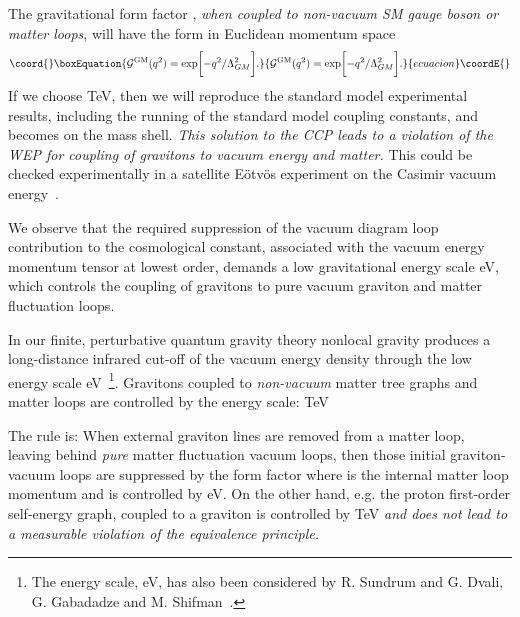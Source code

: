 \documentclass[a4paper,12pt]{article}
\begin{document}
The gravitational form factor \coordHE{}, {\it when
coupled to non-vacuum SM gauge boson or matter loops}, will have the form
in Euclidean momentum space
\begin{equation}\coord{}\boxEquation{ {\cal G}^{\rm GM}(q^2)
=\exp\biggl[-q^2/\Lambda_{GM}^2\biggr].
}{ {\cal G}^{\rm GM}(q^2)
=\exp\biggl[-q^2/\Lambda_{GM}^2\biggr].
}{ecuacion}\coordE{}\end{equation}
If we choose \coordHE{} TeV, then we will
reproduce the standard model experimental results, including the running
of the standard model coupling constants, and \coordHE{} becomes \coordHE{} on the mass
shell. {\it This solution to the CCP leads to a violation of the WEP for
coupling of gravitons to vacuum energy and matter.} This
could be checked experimentally in a satellite E\"otv\"os experiment on the
Casimir vacuum energy~\cite{Ross}.

We observe that the required suppression of the vacuum diagram
loop contribution to the cosmological constant, associated with
the vacuum energy momentum tensor at lowest order,
demands a low gravitational energy scale \coordHE{} eV, which controls the coupling of gravitons to
pure vacuum graviton and matter fluctuation loops.

In our finite, perturbative
quantum gravity theory nonlocal gravity produces a long-distance
infrared cut-off of the vacuum energy density through the low energy
scale \coordHE{} eV~\cite{Moffat2}\footnote{The energy scale,
\coordHE{} eV, has also
been considered by R. Sundrum and G. Dvali, G. Gabadadze and M.
Shifman~\cite{Sundrum}.}.
Gravitons coupled to {\it non-vacuum} matter tree graphs and matter loops
are controlled by the energy scale: \coordHE{}
TeV

The rule is: When external graviton lines are removed from a
matter loop, leaving behind {\it pure} matter fluctuation vacuum loops,
then those initial graviton-vacuum loops are suppressed by the form factor
\coordHE{} where \coordHE{} is the internal matter loop momentum and
\coordHE{} is controlled by \coordHE{} eV.
On the other hand, e.g. the proton first-order self-energy graph, coupled
to a graviton is controlled by \coordHE{} TeV {\it
and does not lead to a measurable violation of the equivalence principle.}
\end{document}
